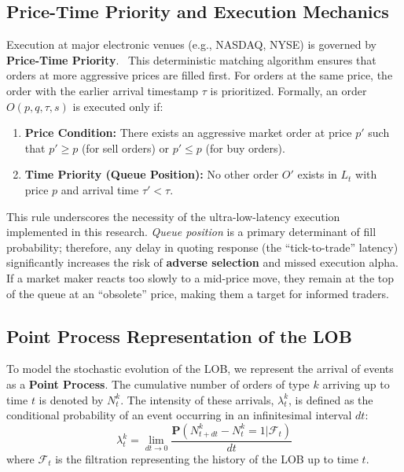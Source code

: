 \subsection{Price-Time Priority and Execution Mechanics}
Execution at major electronic venues (e.g., NASDAQ, NYSE) is governed by \textbf{Price-Time Priority}. \datamethodology\ This deterministic matching algorithm ensures that orders at more aggressive prices are filled first. 
 For orders at the same price, the order with the earlier arrival timestamp $\tau$ is prioritized. Formally, an order $O(p, q, \tau, s)$ is executed only if:
\begin{enumerate}
    \item \textbf{Price Condition:} There exists an aggressive market order at price $p'$ such that $p' \geq p$ (for sell orders) or $p' \leq p$ (for buy orders).
    \item \textbf{Time Priority (Queue Position):} No other order $O'$ exists in $L_t$ with price $p$ and arrival time $\tau' < \tau$.
\end{enumerate}
This rule underscores the necessity of the ultra-low-latency execution implemented in this research. \textit{Queue position} is a primary determinant of fill probability; therefore, any delay in quoting response (the ``tick-to-trade'' latency) significantly increases the risk of \textbf{adverse selection} and missed execution alpha. If a market maker reacts too slowly to a mid-price move, they remain at the top of the queue at an ``obsolete'' price, making them a target for informed traders.

\subsection{Point Process Representation of the LOB}
To model the stochastic evolution of the LOB, we represent the arrival of events as a \textbf{Point Process}. The cumulative number of orders of type $k$ arriving up to time $t$ is denoted by $N_t^k$. The intensity of these arrivals, $\lambda_t^k$, is defined as the conditional probability of an event occurring in an infinitesimal interval $dt$:
\begin{equation}
    \lambda_t^k = \lim_{dt \rightarrow 0} \frac{\mathbf{P}(N_{t+dt}^k - N_t^k = 1 | \mathcal{F}_t)}{dt}
\end{equation}
where $\mathcal{F}_t$ is the filtration representing the history of the LOB up to time $t$. 

